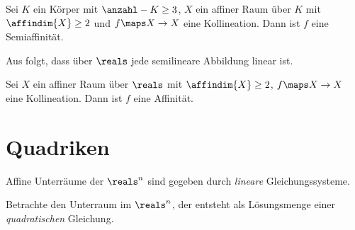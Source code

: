 Sei \( K \) ein Körper mit \( \anzahl-{K}\geq 3 \), \( X \) ein affiner Raum über \( K \) mit \( \affindim{X}\geq 2 \) und \( f\maps X\to X \) eine Kollineation. Dann ist \( f \) eine Semiaffinität.

\begin{bemerkung*}
    Aus  folgt, dass über \( \reals \) jede semilineare Abbildung linear ist.
\end{bemerkung*}
\begin{korollar*}
    Sei \( X \) ein affiner Raum über \( \reals \) mit \( \affindim{X}\geq 2 \), \( f\maps X\to X \) eine Kollineation. Dann ist \( f \) eine Affinität.
\end{korollar*}
\section{Quadriken}
\begin{motivation*}
    Affine Unterräume der \( \reals^n \) sind gegeben durch \emph{lineare} Gleichungssysteme.
\end{motivation*}
Betrachte den Unterraum im \( \reals^n \), der entsteht als Lösungsmenge einer \emph{quadratischen} Gleichung.
